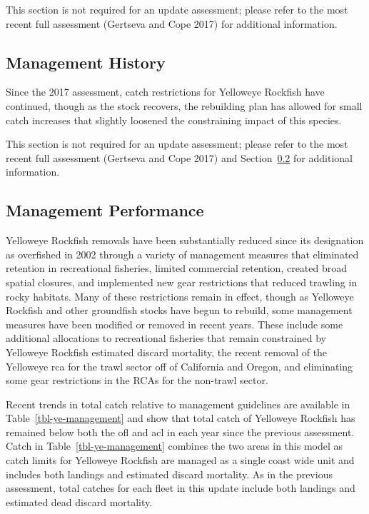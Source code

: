 \documentclass[
]{scrartcl}
\begin{document}
This section is not required for an update assessment; please refer to
the most recent full assessment (Gertseva and Cope 2017) for additional
information.

\subsection{Management History}\label{management-history}

Since the 2017 assessment, catch restrictions for Yelloweye Rockfish
have continued, though as the stock recovers, the rebuilding plan has
allowed for small catch increases that slightly loosened the
constraining impact of this species.

This section is not required for an update assessment; please refer to
the most recent full assessment (Gertseva and Cope 2017) and
Section~\ref{sec-mgmt} for additional information.

\subsection{Management Performance}\label{sec-mgmt}

Yelloweye Rockfish removals have been substantially reduced since its
designation as overfished in 2002 through a variety of management
measures that eliminated retention in recreational fisheries, limited
commercial retention, created broad spatial closures, and implemented
new gear restrictions that reduced trawling in rocky habitats. Many of
these restrictions remain in effect, though as Yelloweye Rockfish and
other groundfish stocks have begun to rebuild, some management measures
have been modified or removed in recent years. These include some
additional allocations to recreational fisheries that remain constrained
by Yelloweye Rockfish estimated discard mortality, the recent removal of
the Yelloweye \gls{rca} for the trawl sector off of California and
Oregon, and eliminating some gear restrictions in the RCAs for the
non-trawl sector.

Recent trends in total catch relative to management guidelines are
available in Table~\ref{tbl-ye-management} and show that total catch of
Yelloweye Rockfish has remained below both the \gls{ofl} and \gls{acl}
in each year since the previous assessment. Catch in
Table~\ref{tbl-ye-management} combines the two areas in this model as
catch limits for Yelloweye Rockfish are managed as a single coast wide
unit and includes both landings and estimated discard mortality. As in
the previous assessment, total catches for each fleet in this update
include both landings and estimated dead discard mortality.
\end{document}
